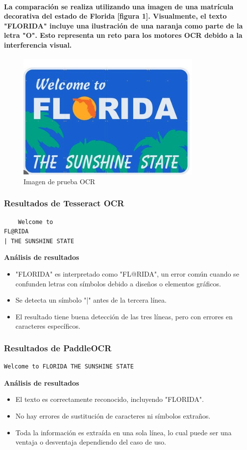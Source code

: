 \documentclass[conference]{IEEEtran}
\begin{document}
\paragraph{La comparación se realiza utilizando una imagen de una matrícula decorativa del estado de Florida [figura 1]. Visualmente, el texto "FLORIDA" incluye una ilustración de una naranja como parte de la letra "O". Esto representa un reto para los motores OCR debido a la interferencia visual.
}
\begin{figure}
    \centering
    \includegraphics[width=0.5\linewidth]{resources/test.jpg}
    \caption{Imagen de prueba OCR}
    \label{fig:enter-label}
\end{figure}
\subsubsection{Resultados de Tesseract OCR}
\begin{verbatim}
    Welcome to
FL@RIDA
| THE SUNSHINE STATE
\end{verbatim}
\textbf{Análisis de resultados}
\begin{itemize}
    \item "FLORIDA" es interpretado como "FL@RIDA", un error común cuando se confunden letras con símbolos debido a diseños o elementos gráficos.
    \item Se detecta un símbolo "|" antes de la tercera línea.
    \item El resultado tiene buena detección de las tres líneas, pero con errores en caracteres específicos.
\end{itemize}

\subsubsection{Resultados de PaddleOCR}
\begin{verbatim}
Welcome to FLORIDA THE SUNSHINE STATE
\end{verbatim}
\textbf{Análisis de resultados}
\begin{itemize}
    \item El texto es correctamente reconocido, incluyendo "FLORIDA".
    \item No hay errores de sustitución de caracteres ni símbolos extraños.
    \item Toda la información es extraída en una sola línea, lo cual puede ser una ventaja o desventaja dependiendo del caso de uso.
\end{itemize}
\end{document}
